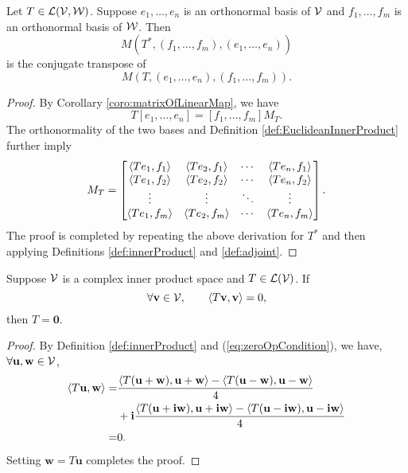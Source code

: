 \begin{thm}
  \label{thm:matrixRelationOfAdjoints}
  Let $T\in {\cal L}({\cal V},{\cal W})$.
  Suppose $e_1,\ldots,e_n$ is an orthonormal basis of ${\cal V}$
  and $f_1,\ldots,f_m$ is an orthonormal basis of ${\cal W}$.
  Then 
  \begin{displaymath}
    M(T^*,(f_1,\ldots,f_m), (e_1,\ldots,e_n))
  \end{displaymath}
  is the conjugate transpose of 
  \begin{displaymath}
    M(T, (e_1,\ldots,e_n) ,(f_1,\ldots,f_m)).
  \end{displaymath}
\end{thm}
\begin{proof}
  By Corollary \ref{coro:matrixOfLinearMap},
  we have
  \begin{displaymath}
    T[e_1,\ldots,e_n] = [f_1,\ldots,f_m] M_T.
  \end{displaymath}
  The orthonormality of the two bases
  and Definition \ref{def:EuclideanInnerProduct} further imply
  \begin{displaymath}
    M_T =
    \begin{bmatrix}
      \left\langle Te_1,f_1 \right\rangle & \left\langle Te_2,f_1 \right\rangle & \cdots & \left\langle Te_n,f_1 \right\rangle
      \\
      \left\langle Te_1,f_2 \right\rangle & \left\langle Te_2,f_2 \right\rangle & \cdots & \left\langle Te_n,f_2 \right\rangle
      \\
      \vdots & \vdots & \ddots & \vdots
      \\
      \left\langle Te_1,f_m \right\rangle & \left\langle Te_2,f_m \right\rangle & \cdots & \left\langle Te_n,f_m \right\rangle
    \end{bmatrix}.
  \end{displaymath}
  The proof is completed by
  repeating the above derivation for $T^*$
  and
  then applying Definitions \ref{def:innerProduct} and \ref{def:adjoint}.
\end{proof}

\begin{lem}
  \label{lem:zeroOpCondition}
  Suppose ${\cal V}$ is a complex inner product space
  and $T\in {\cal L}({\cal V})$.
  If
  \begin{equation}
    \label{eq:zeroOpCondition}
    \forall \mathbf{v}\in {\cal V},\qquad \left\langle T\mathbf{v},\mathbf{v} \right\rangle=0,
  \end{equation}
  then $T=\mathbf{0}$.  
\end{lem}
\begin{proof}
  By Definition \ref{def:innerProduct}
  and (\ref{eq:zeroOpCondition}),
  we have, $\forall \mathbf{u},\mathbf{w}\in {\cal V}$,
  \begin{align*}
    \left\langle T\mathbf{u},\mathbf{w} \right\rangle
    =& \frac{\left\langle T(\mathbf{u}+\mathbf{w}),\mathbf{u}+\mathbf{w} \right\rangle-\left\langle T(\mathbf{u}-\mathbf{w}),\mathbf{u}-\mathbf{w} \right\rangle}{4}
    \\
     &+\mathbf{i} 
       \frac{\left\langle T(\mathbf{u}+\mathbf{i} \mathbf{w}),\mathbf{u}+\mathbf{i} \mathbf{w} \right\rangle-\left\langle T(\mathbf{u}-\mathbf{i} \mathbf{w}),\mathbf{u}-\mathbf{i} \mathbf{w} \right\rangle}{4}
    \\
    =& 0.
  \end{align*}
  Setting $\mathbf{w}=T\mathbf{u}$ completes the proof.
\end{proof}

